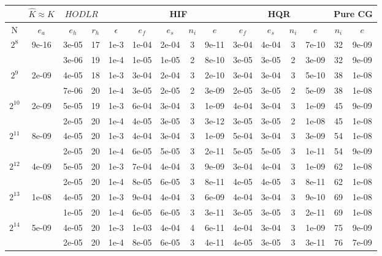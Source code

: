 \documentclass[11pt]{article}
\begin{document}
\begin{table}[!htbp]
\centering
\begin{tabular}{|c|c|c|c|c|c|c|c|c|c|c|c|c|c|c|}
\hline
\multicolumn{1}{c|}{} & \multicolumn{1}{c|}{$\hat{K} \approx K$} & \multicolumn{2}{c|}{$HODLR$} & \multicolumn{1}{c|}{} &\multicolumn{4}{c|}{HIF} & \multicolumn{4}{c|}{HQR} & \multicolumn{2}{c|}{Pure CG} \\
\hline
N & $e_{a}$ & $e_{h}$ & $r_{h}$ & $\epsilon$ & $e_{f}$ & $e_{s}$ & $n_{i}$ & $e$ & $e_{f}$  & $e_{s}$ & $n_{i}$ & $e$ &  $n_{i}$ & $e$ \\ 
\hline
$2^{8}$ & 9e-16 & 3e-05 & 17 & 1e-3 & 1e-04 & 2e-04 & 3 & 9e-11 & 3e-04 & 4e-04 & 3 & 7e-10 & 32 & 9e-09\\
~ & ~ & 3e-06 & 19 & 1e-4 & 1e-05 & 1e-05 & 2 & 8e-10 & 3e-05 & 3e-05 & 2 & 3e-09 & 32 & 9e-09\\
\hline
$2^{9}$ & 2e-09 & 4e-05 & 18 & 1e-3 & 3e-04 & 2e-04 & 3 & 2e-10 & 3e-04 & 3e-04 & 3 & 5e-10 & 38 & 1e-08\\
~ & ~ & 7e-06 & 20 & 1e-4 & 3e-05 & 2e-05 & 2 & 3e-09 & 2e-05 & 3e-05 & 2 & 5e-09 & 38 & 1e-08\\
\hline
$2^{10}$ & 2e-09 & 5e-05 & 19 & 1e-3 & 6e-04 & 3e-04 & 3 & 1e-09 & 4e-04 & 3e-04 & 3 & 1e-09 & 45 & 9e-09\\
~ & ~ & 2e-05 & 20 & 1e-4 & 4e-05 & 3e-05 & 3 & 3e-12 & 3e-05 & 3e-05 & 2 & 1e-08 & 45 & 1e-08\\
\hline
$2^{11}$ & 8e-09 & 4e-05 & 20 & 1e-3 & 4e-04 & 3e-04 & 3 & 1e-09 & 5e-04 & 3e-04 & 3 & 3e-09 & 54 & 1e-08\\
~ & ~ & 2e-05 & 20 & 1e-4 & 6e-05 & 5e-05 & 3 & 2e-11 & 5e-05 & 5e-05 & 3 & 1e-11 & 54 & 9e-09\\
\hline
$2^{12}$ & 4e-09 & 5e-05 & 20 & 1e-3 & 7e-04 & 4e-04 & 3 & 9e-09 & 3e-04 & 4e-04 & 3 & 1e-09 & 62 & 1e-08\\
~ & ~ & 2e-05 & 20 & 1e-4 & 8e-05 & 6e-05 & 3 & 8e-11 & 4e-05 & 4e-05 & 3 & 8e-11 & 62 & 1e-08\\
\hline
$2^{13}$ & 1e-08 & 4e-05 & 20 & 1e-3 & 9e-04 & 4e-04 & 3 & 6e-09 & 4e-04 & 3e-04 & 3 & 9e-10 & 69 & 1e-08\\
~ & ~ & 1e-05 & 20 & 1e-4 & 6e-05 & 6e-05 & 3 & 3e-11 & 3e-05 & 3e-05 & 3 & 2e-11 & 69 & 1e-08\\
\hline
$2^{14}$ & 5e-09 & 4e-05 & 20 & 1e-3 & 1e-03 & 4e-04 & 4 & 6e-11 & 4e-04 & 3e-04 & 3 & 1e-09 & 75 & 9e-09\\
~ & ~ & 2e-05 & 20 & 1e-4 & 8e-05 & 6e-05 & 3 & 4e-11 & 4e-05 & 3e-05 & 3 & 3e-11 & 76 & 7e-09\\

\end{tabular}
\end{table}
\end{document}
